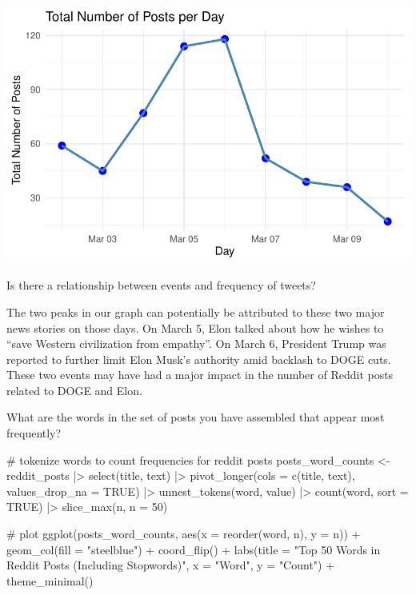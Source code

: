\documentclass[
  letterpaper,
  DIV=11,
  numbers=noendperiod]{scrartcl}
\newenvironment{Shaded}{\begin{snugshade}}{\end{snugshade}}
\newcommand{\AttributeTok}[1]{\textcolor[rgb]{0.40,0.45,0.13}{#1}}
\newcommand{\CommentTok}[1]{\textcolor[rgb]{0.37,0.37,0.37}{#1}}
\newcommand{\ConstantTok}[1]{\textcolor[rgb]{0.56,0.35,0.01}{#1}}
\newcommand{\DecValTok}[1]{\textcolor[rgb]{0.68,0.00,0.00}{#1}}
\newcommand{\FunctionTok}[1]{\textcolor[rgb]{0.28,0.35,0.67}{#1}}
\newcommand{\NormalTok}[1]{\textcolor[rgb]{0.00,0.23,0.31}{#1}}
\newcommand{\OtherTok}[1]{\textcolor[rgb]{0.00,0.23,0.31}{#1}}
\newcommand{\SpecialCharTok}[1]{\textcolor[rgb]{0.37,0.37,0.37}{#1}}
\newcommand{\StringTok}[1]{\textcolor[rgb]{0.13,0.47,0.30}{#1}}
\begin{document}
\includegraphics{Reddit_eda_files/figure-pdf/unnamed-chunk-5-1.pdf}

Is there a relationship between events and frequency of tweets?

The two peaks in our graph can potentially be attributed to these two
major news stories on those days. On March 5, Elon talked about how he
wishes to ``save Western civilization from empathy''. On March 6,
President Trump was reported to further limit Elon Musk's authority amid
backlash to DOGE cuts. These two events may have had a major impact in
the number of Reddit posts related to DOGE and Elon.

What are the words in the set of posts you have assembled that appear
most frequently?

\begin{Shaded}
\begin{Highlighting}[]
\CommentTok{\# tokenize words to count frequencies for reddit posts}
\NormalTok{posts\_word\_counts }\OtherTok{\textless{}{-}}\NormalTok{ reddit\_posts }\SpecialCharTok{|\textgreater{}}
  \FunctionTok{select}\NormalTok{(title, text) }\SpecialCharTok{|\textgreater{}}
  \FunctionTok{pivot\_longer}\NormalTok{(}\AttributeTok{cols =} \FunctionTok{c}\NormalTok{(title, text), }\AttributeTok{values\_drop\_na =} \ConstantTok{TRUE}\NormalTok{) }\SpecialCharTok{|\textgreater{}}
  \FunctionTok{unnest\_tokens}\NormalTok{(word, value) }\SpecialCharTok{|\textgreater{}}
  \FunctionTok{count}\NormalTok{(word, }\AttributeTok{sort =} \ConstantTok{TRUE}\NormalTok{) }\SpecialCharTok{|\textgreater{}}
  \FunctionTok{slice\_max}\NormalTok{(n, }\AttributeTok{n =} \DecValTok{50}\NormalTok{)}

\CommentTok{\# plot}
\FunctionTok{ggplot}\NormalTok{(posts\_word\_counts, }\FunctionTok{aes}\NormalTok{(}\AttributeTok{x =} \FunctionTok{reorder}\NormalTok{(word, n), }\AttributeTok{y =}\NormalTok{ n)) }\SpecialCharTok{+}
  \FunctionTok{geom\_col}\NormalTok{(}\AttributeTok{fill =} \StringTok{"steelblue"}\NormalTok{) }\SpecialCharTok{+}
  \FunctionTok{coord\_flip}\NormalTok{() }\SpecialCharTok{+}
  \FunctionTok{labs}\NormalTok{(}\AttributeTok{title =} \StringTok{"Top 50 Words in Reddit Posts (Including Stopwords)"}\NormalTok{,}
       \AttributeTok{x =} \StringTok{"Word"}\NormalTok{,}
       \AttributeTok{y =} \StringTok{"Count"}\NormalTok{) }\SpecialCharTok{+}
  \FunctionTok{theme\_minimal}\NormalTok{()}
\end{Highlighting}
\end{Shaded}
\end{document}
